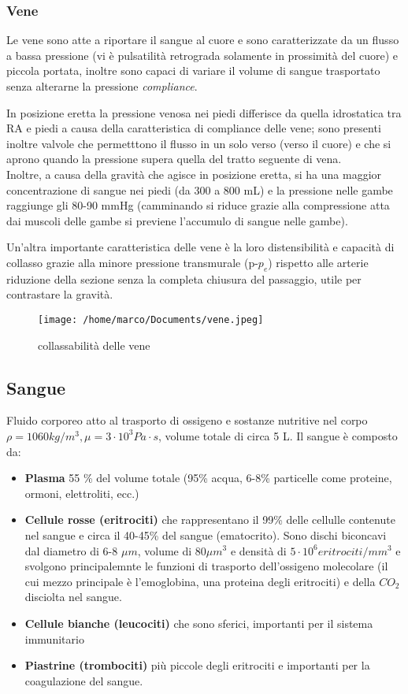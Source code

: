\documentclass[10pt]{article}
\begin{document}
\subsubsection{Vene}
Le vene sono atte a riportare il sangue al cuore e sono caratterizzate da un flusso a bassa pressione (vi è pulsatilità retrograda solamente in prossimità del cuore) e piccola portata, inoltre sono capaci di variare il volume di sangue trasportato senza alterarne la pressione \textrightarrow \textit{compliance}.

In posizione eretta la pressione venosa nei piedi differisce da quella idrostatica tra RA e piedi a causa della caratteristica di compliance delle vene; sono presenti inoltre valvole che permetttono il flusso in un solo verso (verso il cuore) e che si aprono quando la pressione supera quella del tratto seguente di vena.\\
Inoltre, a causa della gravità che agisce in posizione eretta, si ha una maggior concentrazione di sangue nei piedi (da 300 a 800 mL) e la pressione nelle gambe raggiunge gli 80-90 mmHg (camminando si riduce grazie alla compressione atta dai muscoli delle gambe \textrightarrow si previene l'accumulo di sangue nelle gambe).

Un'altra importante caratteristica delle vene è la loro distensibilità e capacità di collasso grazie alla minore pressione transmurale (p-$p_e$) rispetto alle arterie \textrightarrow riduzione della sezione senza la completa chiusura del passaggio, utile per contrastare la gravità.

\begin{figure}[h!]
\centering
\texttt{[image: /home/marco/Documents/vene.jpeg]}
\caption{collassabilità delle vene}
\label{fig:vene}
\end{figure}

\subsection{Sangue}
Fluido corporeo atto al trasporto di ossigeno e sostanze nutritive nel corpo \textrightarrow $\rho=1060kg/m^3,\mu=3 \cdot 10^3 Pa \cdot s $, volume totale di circa 5 L.
Il sangue è composto da:
\begin{itemize}
    \item \textbf{Plasma} 55 \% del volume totale (95\% acqua, 6-8\% particelle come proteine, ormoni, elettroliti, ecc.)
    \item \textbf{Cellule rosse (eritrociti)} che rappresentano il 99\% delle cellulle contenute nel sangue e circa il 40-45\% del sangue (ematocrito). Sono dischi biconcavi dal diametro di 6-8 $\mu m$, volume di $80  \mu m^3$ e densità di $5 \cdot 10^6 eritrociti/mm^3$ e svolgono principalemnte le funzioni di trasporto dell'ossigeno molecolare (il cui mezzo principale è l'emoglobina, una proteina degli eritrociti) e della $CO_2$ disciolta nel sangue. 
    \item \textbf{Cellule bianche (leucociti)} che sono sferici, importanti per il sistema immunitario
    \item \textbf{Piastrine (trombociti)} più piccole degli eritrociti e importanti per la coagulazione del sangue.
\end{itemize}
\end{document}
